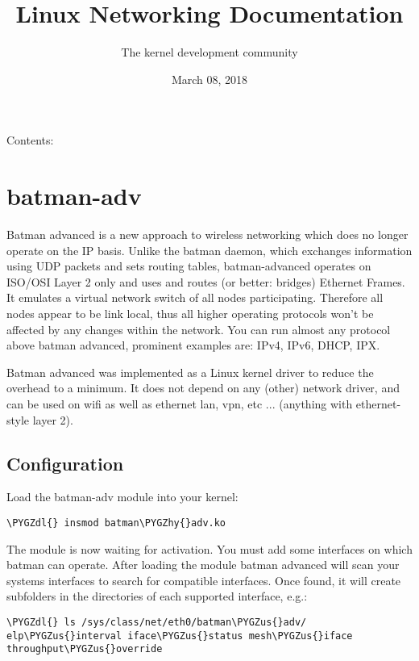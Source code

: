 \documentclass[a4paper,8pt,english]{sphinxmanual}
\title{Linux Networking Documentation}
\date{March 08, 2018}
\author{The kernel development community}
\def\PYGZus{\char`\_}
\def\PYGZdl{\char`\$}
\def\PYGZhy{\char`\-}
\begin{document}
\maketitle
\tableofcontents
{}\label{networking/index::doc}


Contents:


\chapter{batman-adv}
\label{networking/batman-adv:batman-adv}\label{networking/batman-adv::doc}\label{networking/batman-adv:linux-networking-documentation}
Batman advanced is a new approach to wireless networking which does no longer
operate on the IP basis. Unlike the batman daemon, which exchanges information
using UDP packets and sets routing tables, batman-advanced operates on ISO/OSI
Layer 2 only and uses and routes (or better: bridges) Ethernet Frames. It
emulates a virtual network switch of all nodes participating. Therefore all
nodes appear to be link local, thus all higher operating protocols won't be
affected by any changes within the network. You can run almost any protocol
above batman advanced, prominent examples are: IPv4, IPv6, DHCP, IPX.

Batman advanced was implemented as a Linux kernel driver to reduce the overhead
to a minimum. It does not depend on any (other) network driver, and can be used
on wifi as well as ethernet lan, vpn, etc ... (anything with ethernet-style
layer 2).


\section{Configuration}
\label{networking/batman-adv:configuration}
Load the batman-adv module into your kernel:

\begin{Verbatim}[commandchars=\\\{\}]
\PYGZdl{} insmod batman\PYGZhy{}adv.ko
\end{Verbatim}

The module is now waiting for activation. You must add some interfaces on which
batman can operate. After loading the module batman advanced will scan your
systems interfaces to search for compatible interfaces. Once found, it will
create subfolders in the  directories of each supported interface,
e.g.:

\begin{Verbatim}[commandchars=\\\{\}]
\PYGZdl{} ls /sys/class/net/eth0/batman\PYGZus{}adv/
elp\PYGZus{}interval iface\PYGZus{}status mesh\PYGZus{}iface throughput\PYGZus{}override
\end{Verbatim}
\end{document}

